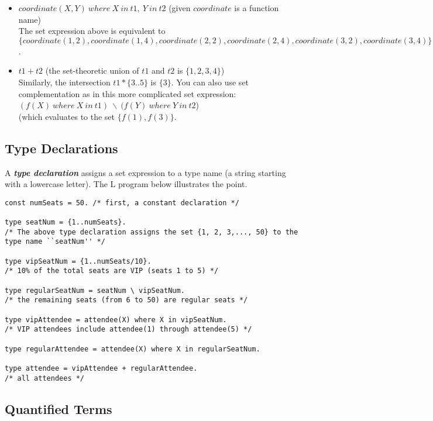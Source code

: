 \documentclass[letterpaper,10pt]{article}
\begin{document}
\begin{flushleft}
\begin{itemize}
\item
$coordinate(X,Y)~where~X~in~t1,~Y~in~t2$ (given $coordinate$ is a function name) \\
The set expression above is equivalent to $\{coordinate(1,2), coordinate(1,4),
coordinate(2,2), coordinate(2,4), coordinate(3,2), coordinate(3,4)\}$.

\item
$t1+t2$ (the set-theoretic union of $t1$ and $t2$ is $\{1,2,3,4\}$) \\
Similarly, the intersection $t1*\{3..5\}$ is $\{3\}$. You can also use set complementation as in this more complicated set expression: \\
$(f(X)~where~X~in~t1)~\backslash~(f(Y)~where~Y~in~t2$) \\
(which evaluates to the set $\{f(1),f(3)\}$.
\end{itemize}

\subsection{Type Declarations}

A \textbf{\textit{type declaration}} assigns a set expression to a type name (a string starting with a lowercase letter). The L program below illustrates the point.

\begin{verbatim}
const numSeats = 50. /* first, a constant declaration */

type seatNum = {1..numSeats}.
/* The above type declaration assigns the set {1, 2, 3,..., 50} to the type name ``seatNum'' */

type vipSeatNum = {1..numSeats/10}.
/* 10% of the total seats are VIP (seats 1 to 5) */

type regularSeatNum = seatNum \ vipSeatNum.
/* the remaining seats (from 6 to 50) are regular seats */

type vipAttendee = attendee(X) where X in vipSeatNum.
/* VIP attendees include attendee(1) through attendee(5) */

type regularAttendee = attendee(X) where X in regularSeatNum.

type attendee = vipAttendee + regularAttendee.
/* all attendees */
\end{verbatim}

\pagebreak


\subsection{Quantified Terms}


\end{flushleft}
\end{document}
